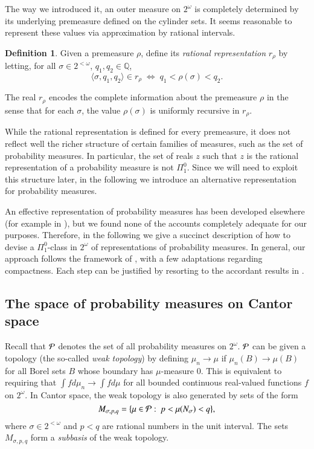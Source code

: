 \documentclass[11pt,reqno]{article}
\theoremstyle{plain}
\theoremstyle{definition}
\newtheorem{defn}{Definition}
\theoremstyle{remark}
\numberwithin{equation}{section}
\newcommand{\Rat}{\ensuremath{\mathbb{Q}}}
\newcommand{\Cant}{\ensuremath{2^{\omega}}}
\newcommand{\Str}[1][<\omega]{\ensuremath{2^{#1}}}
\newcommand{\Cl}[1]{\ensuremath{#1}}
\newcommand{\Cyl}[1]{\ensuremath{N_{#1}}}
\newcommand{\Tup}[1]{\ensuremath{\langle #1 \rangle}}
\newcommand{\Pmeas}{\ensuremath{\CMcal{P}}}
\begin{document}
\medskip
The way we introduced it, an outer measure on $\Cant$ is completely determined by its underlying premeasure defined on the cylinder sets. It seems reasonable to represent these values via approximation by rational intervals.

\begin{defn}\label{def-rational-repr}
	Given a premeasure $\rho$, define its \emph{rational representation} $r_\rho$ by letting, for all $\sigma \in \Str$, $q_1, q_2 \in \Rat$,
	\begin{equation}
		\Tup{\sigma, q_1, q_2} \in r_\rho \; \Leftrightarrow \; q_1 < \rho(\sigma) < q_2.
	\end{equation}
\end{defn}
 
The real $r_\rho$ encodes the complete information about the premeasure $\rho$ in the sense that  for each $\sigma$, the value $\rho(\sigma)$ is uniformly recursive in $r_\rho$. 

\medskip
While the rational representation is defined for every premeasure, it does not reflect well the richer structure of certain families of measures, such as the set of probability measures. In particular, the set of reals $z$ such that $z$ is the rational representation of a probability measure is not $\Pi^0_1$. Since we will need to exploit this structure later, in the following we introduce an alternative representation for probability measures.

An effective representation of probability measures has been developed elsewhere (for example in \citep{gacs:2005}), but we found none of the accounts completely adequate for our purposes. Therefore, in the following we give a succinct description of how to devise a $\Pi^0_1$-class in $\Cant$ of representations of probability measures. In general, our approach follows the framework of \citet{moschovakis:1980}, with a few adaptations regarding compactness. Each step can be justified by resorting to the accordant results in \citep{moschovakis:1980}.



%
%
\subsection{The space of probability measures on Cantor space}

Recall that $\Pmeas$ denotes the set of all probability measures on $\Cant$. $\Pmeas$ can be given a topology (the so-called \emph{weak topology}) by defining $\mu_n \to \mu$ if $\mu_n(\Cl{B}) \to\mu(\Cl{B})$ for all Borel sets $\Cl{B}$ whose boundary has $\mu$-measure $0$. This is equivalent to requiring that $\int f d\mu_n \to \int f d\mu$ for all bounded continuous real-valued functions $f$ on $\Cant$. In Cantor space, the weak topology is also generated by sets of the form
\begin{equation} \label{equ-rat-repres}
	M_{\sigma, p,q} = \{ \mu \in \Pmeas: \: p < \mu(\Cyl{\sigma}) < q \},
\end{equation}
where $\sigma \in \Str$ and $p < q$ are rational numbers in the unit interval. The sets $M_{\sigma, p,q}$ form a \emph{subbasis} of the weak topology.
 
\end{document}
